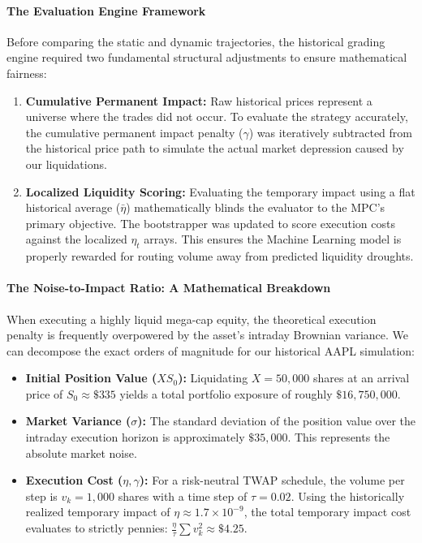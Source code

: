 \documentclass[11pt,a4paper]{article}
\begin{document}
\paragraph{The Evaluation Engine Framework}
Before comparing the static and dynamic trajectories, the historical grading engine required two fundamental structural adjustments to ensure mathematical fairness:
\begin{enumerate}
    \item \textbf{Cumulative Permanent Impact:} Raw historical prices represent a universe where the trades did not occur. To evaluate the strategy accurately, the cumulative permanent impact penalty ($\gamma$) was iteratively subtracted from the historical price path to simulate the actual market depression caused by our liquidations.
    \item \textbf{Localized Liquidity Scoring:} Evaluating the temporary impact using a flat historical average ($\bar{\eta}$) mathematically blinds the evaluator to the MPC's primary objective. The bootstrapper was updated to score execution costs against the localized $\eta_t$ arrays. This ensures the Machine Learning model is properly rewarded for routing volume away from predicted liquidity droughts.
\end{enumerate}

\paragraph{The Noise-to-Impact Ratio: A Mathematical Breakdown}
When executing a highly liquid mega-cap equity, the theoretical execution penalty is frequently overpowered by the asset's intraday Brownian variance. We can decompose the exact orders of magnitude for our historical AAPL simulation:

\begin{itemize}
    \item \textbf{Initial Position Value ($X S_0$):} Liquidating $X = 50,000$ shares at an arrival price of $S_0 \approx \$335$ yields a total portfolio exposure of roughly $\$16,750,000$.
    \item \textbf{Market Variance ($\sigma$):} The standard deviation of the position value over the intraday execution horizon is approximately $\$35,000$. This represents the absolute market noise.
    \item \textbf{Execution Cost ($\eta, \gamma$):} For a risk-neutral TWAP schedule, the volume per step is $v_k = 1,000$ shares with a time step of $\tau = 0.02$. Using the historically realized temporary impact of $\eta \approx 1.7 \times 10^{-9}$, the total temporary impact cost evaluates to strictly pennies: $\frac{\eta}{\tau} \sum v_k^2 \approx \$4.25$.
\end{itemize}
\end{document}

